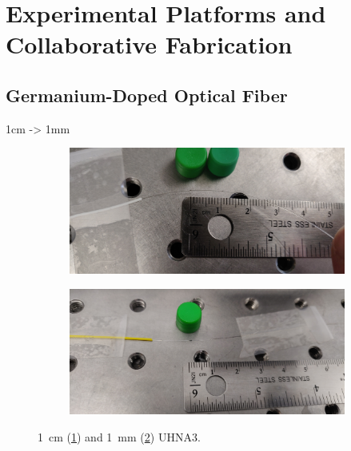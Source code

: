 
\section{Experimental Platforms and Collaborative Fabrication}
\label{sec:Raman:ExperimentalPlatformsandCollaborativeFabrication}

\subsection{Germanium-Doped Optical Fiber}
\label{subsec:Raman:Target:UHNA3}

1cm -> 1mm

\begin{figure}[t]
    \centering
    \begin{subfigure}[b]{0.49\textwidth}
        \centering
        \includegraphics[width=\textwidth]{figs/4-Raman/1cm UHNA3.jpeg}
        \caption{}
        \label{fig:Raman:1cmUHNA3pic}
    \end{subfigure}
    \hfill
    \begin{subfigure}[b]{0.49\textwidth}
        \centering
        \includegraphics[width=\textwidth]{figs/4-Raman/1mm UHNA3 in apparatus.jpeg}
        \caption{}
        \label{fig:Raman:1mmUHNA3pic}
    \end{subfigure}
    \caption{\SI{1}{\centi\meter} (\ref{fig:Raman:1cmUHNA3pic}) and \SI{1}{\milli\meter} (\ref{fig:Raman:1mmUHNA3pic}) \ac{UHNA3}.}
    \label{fig:Raman:UHNA3}
\end{figure}

